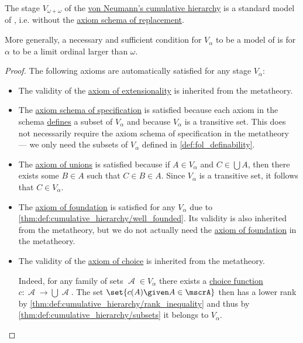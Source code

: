 \begin{theorem}[Model of Z]\label{thm:cumulative_hierarchy_model_of_z}
  The stage \( V_{\omega + \omega} \) of the \hyperref[def:cumulative_hierarchy]{von Neumann's cumulative hierarchy} is a standard model of , i.e.  without the \hyperref[def:zfc/replacement]{axiom schema of replacement}.

  More generally, a necessary and sufficient condition for \( V_\alpha \) to be a model of  is for \( \alpha \) to be a limit ordinal larger than \( \omega \).
\end{theorem}
\begin{proof}
  The following axioms are automatically satisfied for any stage \( V_\alpha \):
  \begin{itemize}
    \item The validity of the \hyperref[def:axiomatic_set_theory/extensionality]{axiom of extensionality} is inherited from the metatheory.

    \item The \hyperref[def:zfc/comprehension]{axiom schema of specification} is satisfied because each axiom in the schema \hyperref[def:fol_definability]{defines} a subset of \( V_\alpha \) and because \( V_\alpha \) is a transitive set. This does not necessarily require the axiom schema of specification in the metatheory --- we only need the subsets of \( V_\alpha \) defined in \cref{def:fol_definability}.

    \item The \hyperref[def:zfc/union]{axiom of unions} is satisfied because if \( A \in V_\alpha \) and \( C \in \bigcup A \), then there exists some \( B \in A \) such that \( C \in B \in A \). Since \( V_\alpha \) is a transitive set, it follows that \( C \in V_\alpha \).

    \item The \hyperref[def:zfc/foundation]{axiom of foundation} is satisfied for any \( V_\alpha \) due to \cref{thm:def:cumulative_hierarchy/well_founded}. Its validity is also inherited from the metatheory, but we do not actually need the \hyperref[def:zfc/foundation]{axiom of foundation} in the metatheory.

    \item The validity of the \hyperref[def:zfc/choice]{axiom of choice} is inherited from the metatheory.

    Indeed, for any family of sets \( \mscrA \in V_\alpha \) there exists a \hyperref[def:choice_function]{choice function} \( c: \mscrA \to \bigcup \mscrA \). The set \( \set{ c(A) \given A \in \mscrA } \) then has a lower rank by \cref{thm:def:cumulative_hierarchy/rank_inequality} and thus by \cref{thm:def:cumulative_hierarchy/subsets} it belongs to \( V_\alpha \).
  \end{itemize}


\end{proof}
